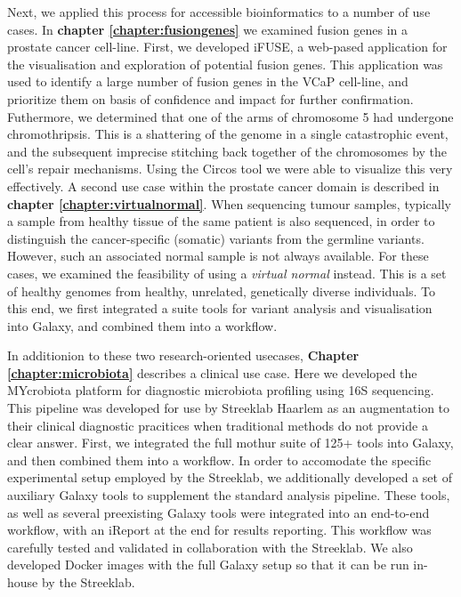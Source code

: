 Next, we applied this process for accessible bioinformatics to a number of use cases. In \textbf{chapter \ref{chapter:fusiongenes}} we examined fusion genes in a prostate cancer cell-line. First, we developed iFUSE, a web-pased application for the visualisation and exploration of potential fusion genes. This application was used to identify a large number of fusion genes in the VCaP cell-line, and prioritize them on basis of confidence and impact for further confirmation. Futhermore, we determined that one of the arms of chromosome 5 had undergone chromothripsis. This is a shattering of the genome in a single catastrophic event, and the subsequent imprecise stitching back together of the chromosomes by the cell's repair mechanisms. Using the Circos tool we were able to visualize this very effectively.
A second use case within the prostate cancer domain is described in \textbf{chapter \ref{chapter:virtualnormal}}. When sequencing tumour samples, typically a sample from healthy tissue of the same patient is also sequenced, in order to distinguish the cancer-specific (somatic) variants from the germline variants. However, such an associated normal sample is not always available. For these cases, we examined the feasibility of using a \emph{virtual normal} instead. This is a set of healthy genomes from healthy, unrelated, genetically diverse individuals. To this end, we first integrated a suite tools for variant analysis and visualisation into Galaxy, and combined them into a workflow.

In additionion to these two research-oriented usecases, \textbf{Chapter \ref{chapter:microbiota}} describes a clinical use case. Here we developed the MYcrobiota platform for diagnostic microbiota profiling using 16S sequencing. This pipeline was developed for use by Streeklab Haarlem as an augmentation to their clinical diagnostic pracitices when traditional methods do not provide a clear answer.
First, we integrated the full mothur suite of 125+ tools into Galaxy, and then combined them into a workflow. In order to accomodate the specific experimental setup employed by the Streeklab, we additionally developed a set of auxiliary Galaxy tools to supplement the standard analysis pipeline.
These tools, as well as several preexisting Galaxy tools were integrated into an end-to-end workflow, with an iReport at the end for results reporting. This workflow was carefully tested and validated in collaboration with the Streeklab. We also developed Docker images with the full Galaxy setup so that it can be run in-house by the Streeklab.

